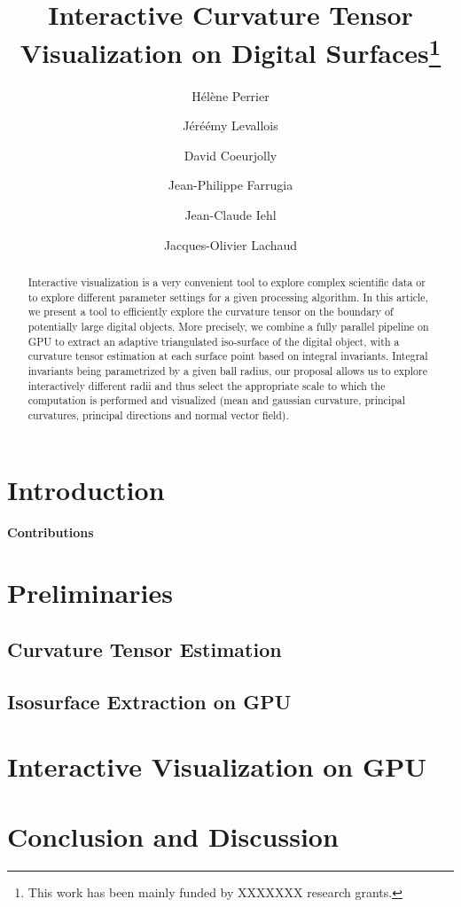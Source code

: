 \documentclass{llncs}
\title{Interactive Curvature Tensor  Visualization on Digital Surfaces\thanks{This work has been mainly funded by
   XXXXXXX  research
    grants.}}
\author{H\'el\`ene Perrier\inst{1}\and J\'eré\'emy Levallois\inst{1}\and  David Coeurjolly\inst{1}\and   Jean-Philippe Farrugia\inst{1}\and Jean-Claude Iehl\inst{1}\and Jacques-Olivier Lachaud\inst{2} }
\institute{ Universit\'e de Lyon, CNRS\\
   LIRIS, UMR5205, F-69621, France
   \and
Universit\'e de Savoie, CNRS\\
LAMA, UMR5127, F-73776, France\\
}
\begin{document}
\maketitle


\begin{abstract}\sloppy
  Interactive visualization is a very convenient tool to explore
  complex scientific data or to explore different parameter settings
  for a given processing algorithm. In this article, we present a tool
  to efficiently explore the curvature tensor on the boundary of
  potentially large digital objects. More precisely, we combine a
  fully parallel pipeline on GPU to extract an adaptive triangulated
  iso-surface of the digital object, with a curvature tensor
  estimation at each surface point based on integral
  invariants. Integral invariants being parametrized by a given ball
  radius, our proposal allows us to explore interactively different
  radii and thus select the appropriate scale to which the computation
  is performed and visualized (mean and gaussian curvature, principal
  curvatures, principal directions and normal vector field).

  
\end{abstract}

\section{Introduction}
\label{sec:introduction}



\textbf{Contributions}


\section{Preliminaries}
\label{sec:preliminaries}

\subsection{Curvature Tensor Estimation}
\label{sec:curv-tens-estim}

\subsection{Isosurface Extraction on GPU}
\label{sec:isos-extr-gpu}

\section{Interactive Visualization on GPU}
\label{sec:inter-visu-gpu}

\section{Conclusion and Discussion}
\label{sec:discussion}





\end{document}

